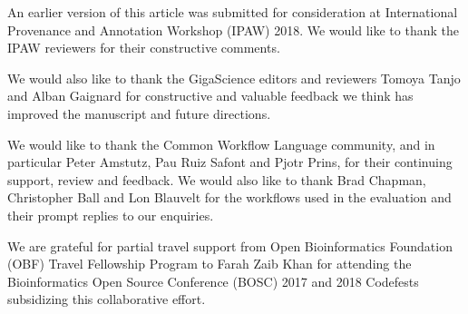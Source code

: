 \documentclass[a4paper,num-refs]{oup-contemporary}
\begin{document}
An earlier version of this article \citep{cwlprov-preprint} was submitted for consideration at International Provenance and Annotation Workshop (IPAW) 2018. We would like to thank the IPAW reviewers for their constructive comments.

We would also like to thank the GigaScience editors and reviewers Tomoya Tanjo and Alban Gaignard for constructive and valuable feedback we think has improved the manuscript and future directions.

We would like to thank the Common Workflow Language community, and in particular Peter Amstutz, Pau Ruiz Safont and Pjotr Prins, for their continuing support, review and feedback. We would also like to thank Brad Chapman, Christopher Ball and Lon Blauvelt for the workflows used in the evaluation and their prompt replies to our enquiries. 

We are grateful for partial travel support from Open Bioinformatics Foundation (OBF) Travel Fellowship Program \citep{OBFTravel} to Farah Zaib Khan for attending the Bioinformatics Open Source Conference (BOSC) 2017 and 2018 Codefests subsidizing this collaborative effort.


\end{document}
